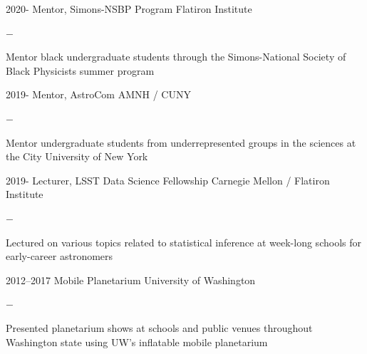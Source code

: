 \documentclass[]{luger-cv} %
\begin{document}
\begin{entrylist}


    \entry
    {2020-}
    {Mentor, Simons-NSBP Program}
    {Flatiron Institute}
    {%
        \vspace{-1em}
        \begin{list}{{\color{numcolor}$-$}}{\cvlist}
            \item Mentor black undergraduate students through the Simons-National
                  Society of Black Physicists summer program
        \end{list}
    }


    \entry
    {2019-}
    {Mentor, AstroCom}
    {AMNH / CUNY}
    {%
        \vspace{-1em}
        \begin{list}{{\color{numcolor}$-$}}{\cvlist}
            \item Mentor undergraduate students from underrepresented groups in the sciences
                  at the City University of New York
        \end{list}
    }


    \ifdefined \onepage \else

        \entry
        {2019-}
        {Lecturer, LSST Data Science Fellowship}
        {Carnegie Mellon / Flatiron Institute}
        {%
            \vspace{-1em}
            \begin{list}{{\color{numcolor}$-$}}{\cvlist}
                \item Lectured on various topics related to statistical
                      inference at week-long schools for early-career astronomers
            \end{list}
        }


        \entry
        {2012--2017}
        {Mobile Planetarium}
        {University of Washington}
        {%
            \vspace{-1em}
            \begin{list}{{\color{numcolor}$-$}}{\cvlist}
                \item Presented planetarium shows at schools and public venues throughout
                      Washington state using UW's inflatable mobile planetarium
            \end{list}
        }


\end{entrylist}
\end{document}
